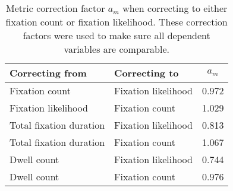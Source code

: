 \begin{table}[ht]
\centering
\caption{Metric correction factor $a_m$ when correcting to either fixation count or fixation likelihood. These correction factors were used to make sure all dependent variables are comparable.} 
\label{tab:metric_correction}
\begin{tabular}{llc}
  \hline
Correcting from & Correcting to & $a_m$ \\ 
  \hline
Fixation count & Fixation likelihood & 0.972 \\ 
  Fixation likelihood & Fixation count & 1.029 \\ 
  Total fixation duration & Fixation likelihood & 0.813 \\ 
  Total fixation duration & Fixation count & 1.067 \\ 
  Dwell count & Fixation likelihood & 0.744 \\ 
  Dwell count & Fixation count & 0.976 \\ 
   \hline
\end{tabular}
\end{table}
